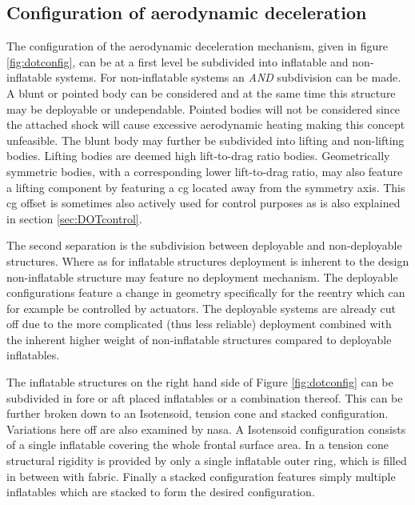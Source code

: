 \subsection{Configuration of aerodynamic deceleration}
The configuration of the aerodynamic deceleration mechanism, given in figure \ref{fig:dotconfig}, can be at a first level be subdivided into inflatable and non-inflatable systems. For non-inflatable systems an \textit{AND} subdivision can be made. A blunt or pointed body can be considered and at the same time this structure may be deployable or undependable. Pointed bodies will not be considered since the attached shock will cause excessive aerodynamic heating \cite{AndersonJr.2007} making this concept unfeasible. The blunt body may further be subdivided into lifting and non-lifting bodies. Lifting bodies are deemed high lift-to-drag ratio bodies. Geometrically symmetric bodies, with a corresponding lower lift-to-drag ratio, may also feature a lifting component by featuring a \gls{cg} located away from the symmetry axis. This \gls{cg} offset is sometimes also actively used for control purposes\cite{Dillman2012} as is also explained in section \ref{sec:DOTcontrol}. 

The second separation is  the subdivision between deployable and non-deployable structures. Where as for inflatable structures deployment is inherent to the design non-inflatable structure may feature no deployment mechanism. The deployable configurations feature a change in geometry specifically for the reentry which can for example be controlled by actuators. The deployable systems are already cut off due to the more complicated (thus less reliable) deployment combined with the inherent higher weight of non-inflatable structures \cite{Cianciolo2010} compared to deployable inflatables.

The inflatable structures on the right hand side of Figure \ref{fig:dotconfig} can be subdivided in fore or aft placed inflatables or a combination thereof. This can be further broken down to an Isotensoid, tension cone and stacked configuration. Variations here off are also examined by \gls{nasa}\cite{Smith2010}. A Isotensoid configuration consists of a single inflatable covering the whole frontal surface area. In a tension cone structural rigidity is provided by only a single inflatable outer ring, which is filled in between with fabric. Finally a stacked configuration features simply multiple inflatables which are stacked to form the desired configuration.

